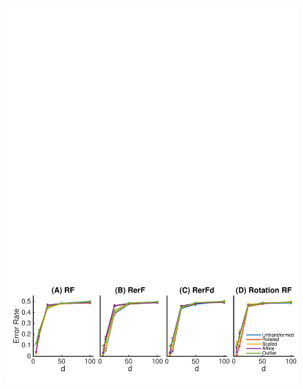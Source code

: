 \documentclass{article} %
\begin{document}
\begin{figure}[h]
\begin{center}
\includegraphics[trim=0in 0in 0in 0in, clip=true, width=\linewidth]{../Figures/pdf/Fig3_transformations}
\end{center}
\caption{}
\label{fig:transformations}
\end{figure}
\end{document}
